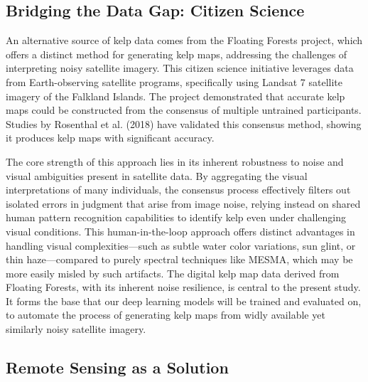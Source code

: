 \documentclass{article}
\begin{document}
\subsection{Bridging the Data Gap: Citizen Science} 

An alternative source of kelp data comes from the Floating Forests project, which offers a distinct method for generating kelp maps, addressing the challenges of interpreting noisy satellite imagery. This citizen science initiative leverages data from Earth-observing satellite programs, specifically using Landsat 7 satellite imagery of the Falkland Islands. The project demonstrated that accurate kelp maps could be constructed from the consensus of multiple untrained participants. Studies by Rosenthal et al. (2018) have validated this consensus method, showing it produces kelp maps with significant accuracy. 
        
The core strength of this approach lies in its inherent robustness to noise and visual ambiguities present in satellite data. By aggregating the visual interpretations of many individuals, the consensus process effectively filters out isolated errors in judgment that arise from image noise, relying instead on shared human pattern recognition capabilities to identify kelp even under challenging visual conditions. This human-in-the-loop approach offers distinct advantages in handling visual complexities—such as subtle water color variations, sun glint, or thin haze—compared to purely spectral techniques like MESMA, which may be more easily misled by such artifacts. The digital kelp map data derived from Floating Forests, with its inherent noise resilience, is central to the present study. It forms the base that our deep learning models will be trained and evaluated on, to automate the process of generating kelp maps from widly available yet similarly noisy satellite imagery.

\subsection{Remote Sensing as a Solution} 
\end{document}
